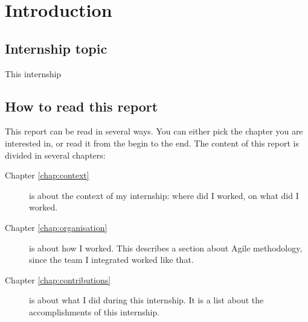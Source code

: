 \chapter{Introduction}

\section{Internship topic}
This internship

\section{How to read this report}

This report can be read in several ways. You can either pick the chapter you are
interested in, or read it from the begin to the end. The content of this report
is divided in several chapters:

\begin{description}
    \item[Chapter \ref{chap:context}] is about the context of my internship: where did I worked, on what did I worked.
    \item[Chapter \ref{chap:organisation}] is about how I worked. This describes a section about Agile methodology, since the
        team I integrated worked like that.
    \item[Chapter \ref{chap:contributions}] is about what I did during this internship. It is a list about the accomplishments
        of this internship.
\end{description}
